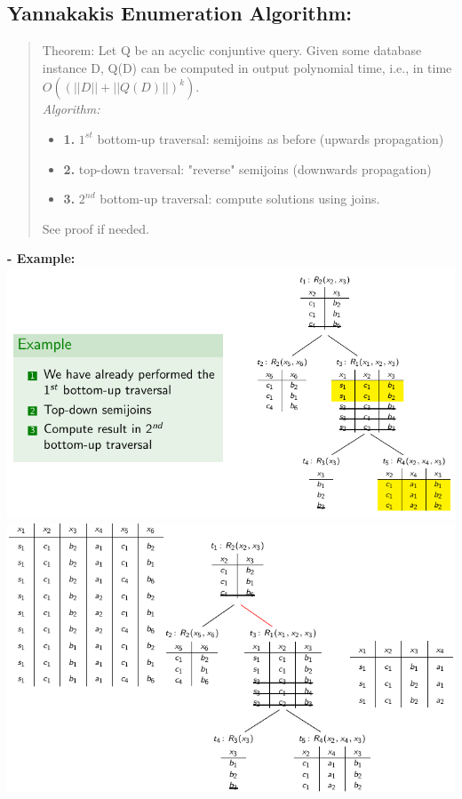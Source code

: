 \documentclass{article}
\begin{document}
\subsection{Yannakakis Enumeration Algorithm: }
\begin{quote}
    Theorem: Let Q be an acyclic conjuntive query. Given some database instance D, Q(D) can be computed in output polynomial time, i.e., in time $O((||D||+||Q(D)||)^k)$.\\
    \textit{Algorithm: }\\
    \begin{itemize}
        \item \textbf{1. }$1^{st}$ bottom-up traversal: semijoins as before (upwards propagation)
        \item \textbf{2. }top-down traversal: "reverse" semijoins (downwards propagation)
        \item \textbf{3. }$2^{nd}$ bottom-up traversal: compute solutions using joins.
    \end{itemize}
    See proof if needed.
\end{quote}
\textbf{- Example: }\\
\includegraphics[scale=0.3]{75.png}
\includegraphics[scale=0.3]{76.png}
\newpage
\end{document}
